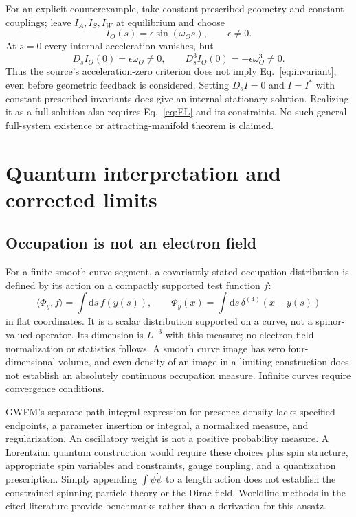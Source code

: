 \documentclass[aip,jmp,reprint,onecolumn,amsmath,amssymb]{revtex4-2}
\newcommand{\dd}{\mathrm{d}}
\newcommand{\Ds}{D_s}
\begin{document}
For an explicit counterexample, take constant prescribed geometry and constant couplings; leave $I_A,I_S,I_W$ at equilibrium and choose
\begin{equation}
 I_O(s)=\epsilon\sin(\omega_Os),\qquad \epsilon\ne0.
\end{equation}
At $s=0$ every internal acceleration vanishes, but
\begin{equation}
 \Ds I_O(0)=\epsilon\omega_O\ne0,\qquad
 \Ds^3I_O(0)=-\epsilon\omega_O^3\ne0.
\end{equation}
Thus the source's acceleration-zero criterion does not imply Eq.~\eqref{eq:invariant}, even before geometric feedback is considered. Setting $\Ds I=0$ and $I=I^*$ with constant prescribed invariants does give an internal stationary solution. Realizing it as a full solution also requires Eq.~\eqref{eq:EL} and its constraints. No such general full-system existence or attracting-manifold theorem is claimed.

\section{Quantum interpretation and corrected limits}
\subsection{Occupation is not an electron field}
For a finite smooth curve segment, a covariantly stated occupation distribution is defined by its action on a compactly supported test function $f$:
\begin{equation}
 \langle\Phi_y,f\rangle=\int\dd s\,f(y(s)),\qquad
 \Phi_y(x)=\int\dd s\,\delta^{(4)}(x-y(s))
 \label{eq:occupation}
\end{equation}
in flat coordinates. It is a scalar distribution supported on a curve, not a spinor-valued operator. Its dimension is $L^{-3}$ with this measure; no electron-field normalization or statistics follows. A smooth curve image has zero four-dimensional volume, and even density of an image in a limiting construction does not establish an absolutely continuous occupation measure. Infinite curves require convergence conditions.

GWFM's separate path-integral expression for presence density lacks specified endpoints, a parameter insertion or integral, a normalized measure, and regularization. An oscillatory weight is not a positive probability measure. A Lorentzian quantum construction would require these choices plus spin structure, appropriate spin variables and constraints, gauge coupling, and a quantization prescription. Simply appending $\int\psi\dot\psi$ to a length action does not establish the constrained spinning-particle theory or the Dirac field. Worldline methods in the cited literature provide benchmarks rather than a derivation for this ansatz.\cite{strassler,schubert}
\end{document}
